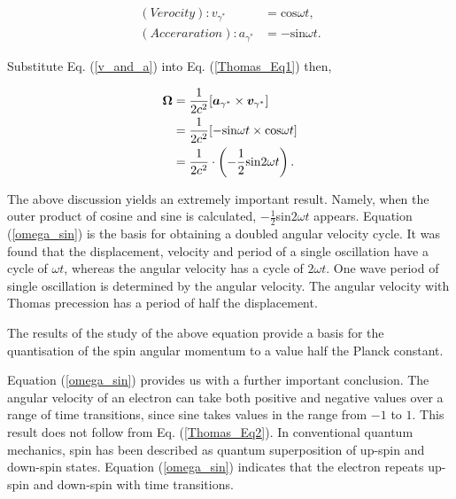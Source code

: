 \documentclass[%
 reprint,
 amsmath,amssymb,
 aps,
]{revtex4-1}
\numberwithin{equation}{section}%
\begin{document}
    \begin{equation}
        \begin{split}
            (Verocity): v_{\gamma^{*}}
                &= \mathrm{cos}\omega t , \\
            (Acceraration): a_{\gamma^{*}}
                &= - \mathrm{sin}\omega t
                .
        \label{v_and_a}
        \end{split}
    \end{equation}

Substitute Eq. (\ref{v_and_a}) into Eq. (\ref{Thomas_Eq1}) then,

    \begin{equation}
        \begin{split}
            {\bf \Omega} 
                &= \frac{1}{2 c^2}[{\boldsymbol a_{\gamma^{*}}} \times {\boldsymbol v_{\gamma^{*}}} ]  \\
                &= \frac{1}{2 c^2} [ -\mathrm{sin}\omega t \times \mathrm{cos}\omega t ] \\
                &= \frac{1}{2 c^2} \cdot \left( - \frac{1}{2} \mathrm{sin}2\omega t \right)
                .
        \label{omega_sin}
        \end{split}
    \end{equation}

The above discussion yields an extremely important result. Namely, when the outer product of cosine and sine is calculated, $-\frac{1}{2}$sin$2\omega t$ appears. Equation (\ref{omega_sin}) is the basis for obtaining a doubled angular velocity cycle. It was found that the displacement, velocity and period of a single oscillation have a cycle of $\omega t$, whereas the angular velocity has a cycle of $2\omega t$. One wave period of single oscillation is determined by the angular velocity. The angular velocity with Thomas precession has a period of half the displacement.

The results of the study of the above equation provide a basis for the quantisation of the spin angular momentum to a value half the Planck constant.

Equation (\ref{omega_sin}) provides us with a further important conclusion. The angular velocity of an electron can take both positive and negative values over a range of time transitions, since sine takes values in the range from $-1$ to $1$. This result does not follow from Eq. (\ref{Thomas_Eq2}). In conventional quantum mechanics, spin has been described as quantum superposition of up-spin and down-spin states. Equation (\ref{omega_sin}) indicates that the electron repeats up-spin and down-spin with time transitions.
\end{document}
